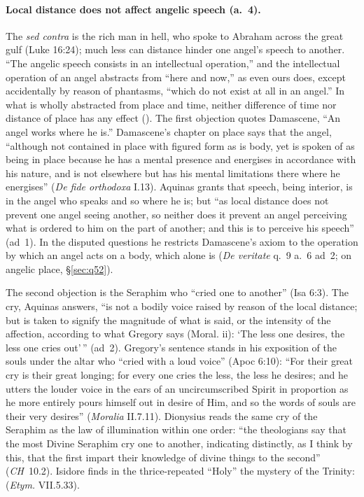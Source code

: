 \paragraph{Local distance does not affect angelic speech (a.~4).} The
\emph{sed contra} is the rich man in hell, who spoke to Abraham across the
great gulf (Luke 16:24); much less can distance hinder one angel's speech to
another. ``The angelic speech consists in an intellectual operation,'' and
the intellectual operation of an angel abstracts from ``here and now,'' as
even ours does, except accidentally by reason of phantasms, ``which do not
exist at all in an angel.'' In what is wholly abstracted from place and
time, neither difference of time nor distance of place has any effect
(). The first objection quotes Damascene, ``An angel
works where he is.'' Damascene's chapter on place says that the angel,
``although not contained in place with figured form as is body, yet is
spoken of as being in place because he has a mental presence and energises
in accordance with his nature, and is not elsewhere but has his mental
limitations there where he energises'' (\emph{De fide orthodoxa} I.13).
Aquinas grants that speech, being interior, is in the angel who speaks and so
where he is; but ``as local distance does not prevent one angel seeing
another, so neither does it prevent an angel perceiving what is ordered to
him on the part of another; and this is to perceive his speech'' (ad~1).
In the disputed questions he restricts Damascene's axiom to the operation
by which an angel acts on a body, which alone is  (\emph{De
veritate} q.~9 a.~6 ad~2; on angelic place, \S\ref{sec:q52}).

The second objection is the Seraphim who ``cried one to another'' (Isa 6:3).
The cry, Aquinas answers, ``is not a bodily voice raised by reason of the
local distance; but is taken to signify the magnitude of what is said, or
the intensity of the affection, according to what Gregory says (Moral. ii):
`The less one desires, the less one cries out'\,'' (ad~2). Gregory's sentence
stands in his exposition of the souls under the altar who ``cried with a loud
voice'' (Apoc 6:10): ``For their great cry is their great longing; for every
one cries the less, the less he desires; and he utters the louder voice in
the ears of an uncircumscribed Spirit in proportion as he more entirely pours
himself out in desire of Him, and so the words of souls are their very
desires'' (\emph{Moralia} II.7.11). Dionysius reads the same cry of the
Seraphim as the law of illumination within one order: ``the theologians say
that the most Divine Seraphim cry one to another, indicating distinctly, as I
think by this, that the first impart their knowledge of divine things to the
second'' (\emph{CH}~10.2). Isidore finds in the thrice-repeated ``Holy'' the
mystery of the Trinity:  (\emph{Etym.} VII.5.33).

